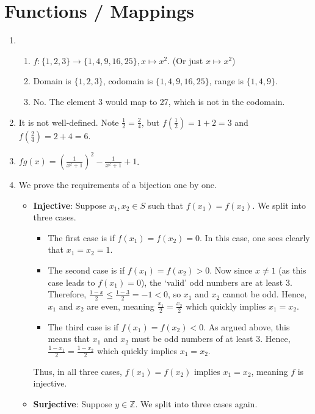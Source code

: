 \section{Functions / Mappings}
\begin{enumerate}
    \item \begin{enumerate}[label=(\roman*)]
        \item $f: \{1, 2, 3\} \to \{1, 4, 9, 16, 25\}, x \mapsto x^2$. (Or just $x \mapsto x^2$)
        \item Domain is $\{1, 2, 3\}$, codomain is $\{1, 4, 9, 16, 25\}$, range is $\{1, 4, 9\}$.
        \item No. The element 3 would map to 27, which is not in the codomain.
    \end{enumerate}
    \item It is not well-defined. Note $\frac 12 = \frac 24$, but $f(\frac12) = 1 + 2 = 3$ and $f(\frac24) = 2 + 4 = 6$.
    \item $fg(x) = \left(\frac1{x^2+1}\right)^2 - \frac1{x^2+1} + 1$.
    \item We prove the requirements of a bijection one by one.
    \begin{itemize}
        \item \textbf{Injective}: Suppose $x_1, x_2 \in S$ such that $f(x_1) = f(x_2)$. We split into three cases.
        \begin{itemize}
            \item The first case is if $f(x_1) = f(x_2) = 0$. In this case, one sees clearly that $x_1 = x_2 = 1$.
            \item The second case is if $f(x_1) = f(x_2) > 0$. Now since $x \neq 1$ (as this case leads to $f(x_1) = 0$), the `valid' odd numbers are at least 3. Therefore, $\frac{1-x}{2} \leq \frac{1-3}{2} = -1 < 0$, so $x_1$ and $x_2$ cannot be odd. Hence, $x_1$ and $x_2$ are even, meaning $\frac{x_1}{2} = \frac{x_2}{2}$ which quickly implies $x_1 = x_2$.
            \item The third case is if $f(x_1) = f(x_2) < 0$. As argued above, this means that $x_1$ and $x_2$ must be odd numbers of at least 3. Hence, $\frac{1-x_1}{2} = \frac{1-x_2}{2}$ which quickly implies $x_1 = x_2$.
        \end{itemize}
        Thus, in all three cases, $f(x_1) = f(x_2)$ implies $x_1 = x_2$, meaning $f$ is injective.
        \item \textbf{Surjective}: Suppose $y \in \mathbb{Z}$. We split into three cases again.
        \begin{itemize}

\end{itemize}
\end{itemize}
\end{enumerate}
